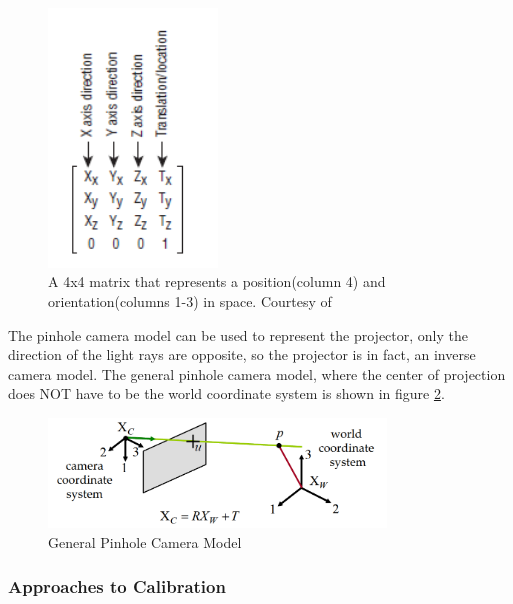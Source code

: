 \documentclass[]{article}
\begin{document}
\begin{figure}[hbtp]
    \centering
    \includegraphics[width=0.4\textwidth]{figures/MVMatrixOGLSB.PNG}
    \caption{A 4x4 matrix that represents a position(column 4) and orientation(columns 1-3) in space. Courtesy of \cite{superbible}}
    \label{fig:MVMatrix}
\end{figure}

The pinhole camera model can be used to represent the projector, only the direction of the light rays are opposite, so the projector is in fact, an inverse camera model. The general pinhole camera model, where the center of projection does NOT have to be the world coordinate system is shown in figure \ref{fig:PinholeCameraModel}.

\begin{figure}[hbtp]
    \centering
    \includegraphics[width=0.8\textwidth]{figures/GeneralPinholeModel.PNG}
    \caption{General Pinhole Camera Model}
    \label{fig:PinholeCameraModel}
\end{figure}
\newpage
\subsubsection{Approaches to Calibration}
\end{document}
